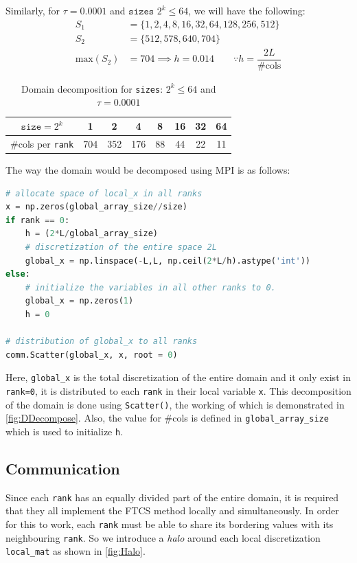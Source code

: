 Similarly, for $\tau=0.0001$ and $\texttt{sizes } 2^k\leq64$, we will have the following:
\begin{equation}
\begin{aligned}
    S_1 &= \{1,2,4,8,16,32,64,128,256,512 \}  \\
    S_2 &= \{512,578,640,704 \} \\
    \text{max}(S_2) &= 704 \implies h = 0.014 \quad\quad \because h=\dfrac{2L}{\text{\#cols}}
\end{aligned}
\label{eq:ddt4}
\end{equation}
\begin{table}[H]
    \centering
    \begin{tabular}{|c|c|c|c|c|c|c|c|}
        \hline
        $\texttt{size}=2^k$ & 1 & 2 & 4 & 8 & 16 & 32 & 64 \\
        \hline
        \#cols per \texttt{rank} & 704 & 352 & 176 & 88 & 44 & 22 & 11 \\
        \hline
    \end{tabular}
    \caption{Domain decomposition for \texttt{sizes}: $2^k\leq64$ and $\tau=0.0001$}
    \label{tab:DomainDecomposition2}
\end{table}

The way the domain would be decomposed using MPI is as follows:
\begin{lstlisting}[language=Python]
# allocate space of local_x in all ranks
x = np.zeros(global_array_size//size) 
if rank == 0:
    h = (2*L/global_array_size)
    # discretization of the entire space 2L
    global_x = np.linspace(-L,L, np.ceil(2*L/h).astype('int'))
else:
    # initialize the variables in all other ranks to 0.
    global_x = np.zeros(1)
    h = 0

# distribution of global_x to all ranks
comm.Scatter(global_x, x, root = 0) 
\end{lstlisting}

Here, \texttt{global\_x} is the total discretization of the entire domain and it only exist in \texttt{rank=0}, it is distributed to each \texttt{rank} in their local variable \texttt{x}. This decomposition of the domain is done using \texttt{Scatter()}, the working of which is demonstrated in \autoref{fig:DDecompose}. Also, the value for \#cols is defined in \texttt{global\_array\_size} which is used to initialize \texttt{h}. 

\figDDecompose

\subsection{Communication}
Since each \texttt{rank} has an equally divided part of the entire domain, it is required that they all implement the FTCS method locally and simultaneously. In order for this to work, each \texttt{rank} must be able to share its bordering values with its neighbouring \texttt{rank}. So we introduce a \textit{halo} around each local discretization \texttt{local\_mat} as shown in \autoref{fig:Halo}.

